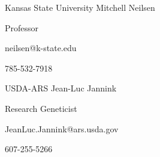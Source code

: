 \begin{cventries}
  \cventry
    {Kansas State University} %
    {Mitchell Neilsen} %
    {} %
    {} %
    {
      \begin{cvitems} %
        \item {Professor}
        \item {neilsen@k-state.edu}
        \item {785-532-7918}
      \end{cvitems}
    }

  \cventry
    {USDA-ARS} %
    {Jean-Luc Jannink} %
    {} %
    {} %
    {
      \begin{cvitems} %
        \item {Research Geneticist}
        \item {JeanLuc.Jannink@ars.usda.gov}
        \item {607-255-5266}
      \end{cvitems}
    }

    
\end{cventries}